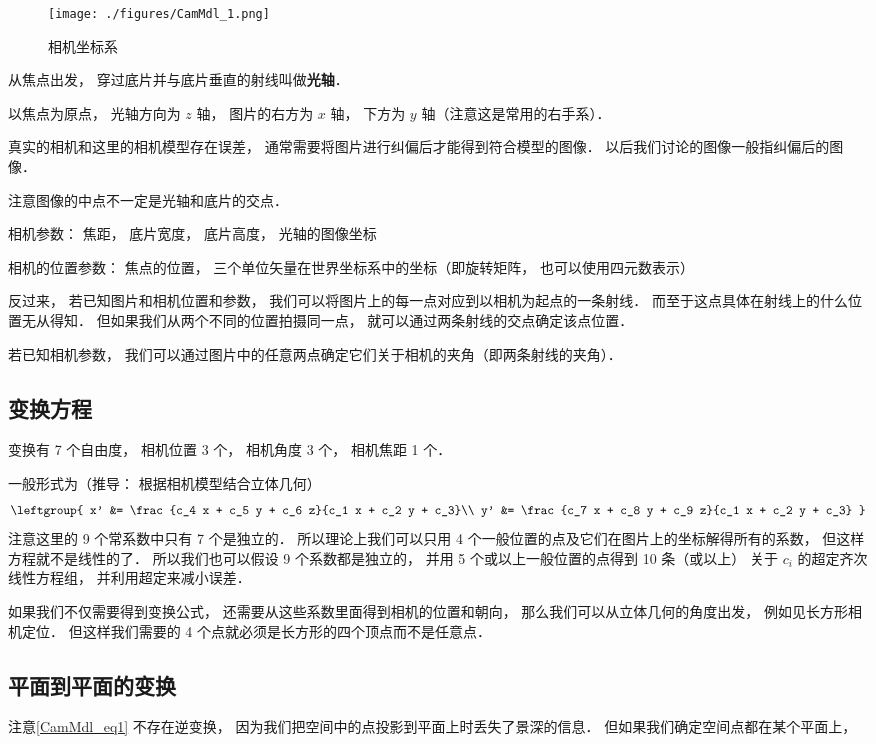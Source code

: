 
\begin{figure}[ht]
\centering
\texttt{[image: ./figures/CamMdl\_1.png]}
\caption{相机坐标系} \label{CamMdl_fig1}
\end{figure}

从焦点出发， 穿过底片并与底片垂直的射线叫做\textbf{光轴}．

以焦点为原点， 光轴方向为 $z$ 轴， 图片的右方为 $x$ 轴， 下方为 $y$ 轴（注意这是常用的右手系）．

真实的相机和这里的相机模型存在误差， 通常需要将图片进行纠偏后才能得到符合模型的图像． 以后我们讨论的图像一般指纠偏后的图像．

注意图像的中点不一定是光轴和底片的交点．

相机参数： 焦距， 底片宽度， 底片高度， 光轴的图像坐标

相机的位置参数： 焦点的位置， 三个单位矢量在世界坐标系中的坐标（即旋转矩阵， 也可以使用四元数表示）

反过来， 若已知图片和相机位置和参数， 我们可以将图片上的每一点对应到以相机为起点的一条射线． 而至于这点具体在射线上的什么位置无从得知． 但如果我们从两个不同的位置拍摄同一点， 就可以通过两条射线的交点确定该点位置．

若已知相机参数， 我们可以通过图片中的任意两点确定它们关于相机的夹角（即两条射线的夹角）．

\subsection{变换方程}
变换有 7 个自由度， 相机位置 3 个， 相机角度 3 个， 相机焦距 1 个．

一般形式为（推导： 根据相机模型结合立体几何）
\begin{equation}\label{CamMdl_eq1}
\leftgroup{
x' &= \frac{c_4 x + c_5 y + c_6 z}{c_1 x + c_2 y + c_3}\\
y' &= \frac{c_7 x + c_8 y + c_9 z}{c_1 x + c_2 y + c_3}
}
\end{equation}
注意这里的 9 个常系数中只有 7 个是独立的． 所以理论上我们可以只用 4 个一般位置的点及它们在图片上的坐标解得所有的系数， 但这样方程就不是线性的了． 所以我们也可以假设 9 个系数都是独立的， 并用 5 个或以上一般位置的点得到 10 条（或以上） 关于 $c_i$ 的超定齐次线性方程组， 并利用超定来减小误差．

如果我们不仅需要得到变换公式， 还需要从这些系数里面得到相机的位置和朝向， 那么我们可以从立体几何的角度出发， 例如见长方形相机定位． 但这样我们需要的 4 个点就必须是长方形的四个顶点而不是任意点．

\subsection{平面到平面的变换}
注意\autoref{CamMdl_eq1} 不存在逆变换， 因为我们把空间中的点投影到平面上时丢失了景深的信息． 但如果我们确定空间点都在某个平面上， 